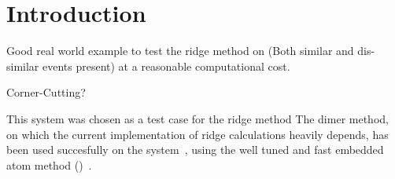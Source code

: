 \section{Introduction}
\label{sec:al-introduction}

\bit
\item Good real world example to test the ridge method on (Both similar and dis-similar events present) at a reasonable computational cost.
\item Corner-Cutting?
\eit

This system was chosen as a test case for the ridge method \expand
The dimer method, on which the current implementation of ridge calculations heavily depends, has been used succesfully on the system~\cite{dimer-original1999}, using the well tuned and fast embedded atom method ()~\cite{eam-1983, eam-1986}.

\incomplete
